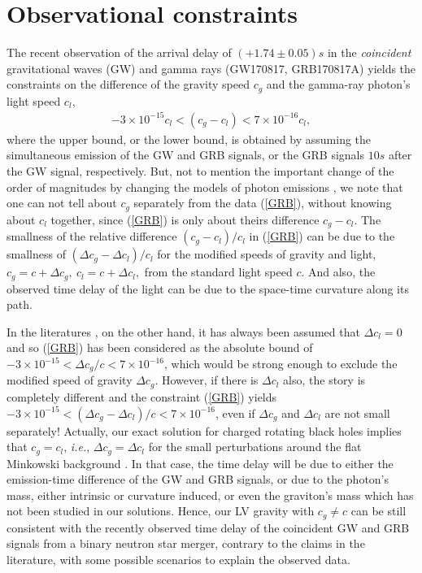 \documentclass[preprint,aps,tightenlines,showkeys,nofootinbib,superscriptaddress]{revtex4}
\newcommand{\beq}{\begin{eqnarray}}
\newcommand{\eeq}{\end{eqnarray}}
\newcommand{\De}{\Delta}
\begin{document}
\section{Observational constraints}

The recent observation of the arrival delay of $(+1.74 \pm 0.05)s$ in the  {\it coincident} gravitational waves (GW) and gamma rays (GW170817, GRB170817A) \cite{LIGO:2017} yields the constraints on the difference of the gravity speed $c_{g}$ and the gamma-ray photon's light speed $c_l$,
\beq
-3 \times 10^{-15} c_l < (c_g-c_l) < 7 \times 10^{-16} c_l,
\label{GRB}
\eeq
where the upper bound, or the lower bound, is obtained by assuming the simultaneous emission of the GW and GRB signals, or the GRB signals $10 s$ after the GW signal, respectively. But, not to mention the important change of the order of magnitudes by changing the models of photon emissions \cite{LIGO:2017}, we note that one can not tell about $c_g$ separately from the data (\ref{GRB}), without knowing about $c_l$ together, since (\ref{GRB}) is only about theirs difference $c_g-c_l$. The smallness of the relative difference $(c_g-c_l)/c_l$ in (\ref{GRB}) can be due to the smallness of $(\De c_g-\De c_l)/c_l$ for the modified speeds of gravity and light, $c_g=c+\De c_g, ~c_l=c+\De c_l,$ from the standard light speed $c$. And also, the observed time delay of the light can be due to the space-time curvature along its path.

In the literatures \cite{Emir:2017,Gong:2018}, on the other hand, it has always been assumed that $\De c_l=0$ and so (\ref{GRB}) has been considered as the absolute bound of $-3 \times 10^{-15}< \De c_g/c < 7 \times 10^{-16}$, which would be strong enough to exclude the modified speed of gravity $\De c_g$. However, if there is $\De c_l$ also, the story is completely different and the constraint (\ref{GRB}) yields $-3 \times 10^{-15}< (\De c_g-\De c_l)/c < 7 \times 10^{-16}$, even if $\De c_g$ and $\De c_l$ are not small separately! Actually, our exact solution for charged rotating black holes implies that $c_g=c_l$, {\it i.e.}, $\De c_g=\De c_l$ for the small perturbations around the flat Minkowski background \cite{Park:2009}. In that case, the time delay will be due to either the emission-time difference of the GW and GRB signals, or due to the photon's mass, either intrinsic or curvature induced, or even the graviton's mass which has not been studied in our solutions. Hence, our LV gravity with $c_g \neq c$ can be still consistent with the recently observed time delay of the coincident GW and GRB signals from a binary neutron star merger, contrary to the claims in the literature, with some possible scenarios to explain the observed data.
\end{document}
